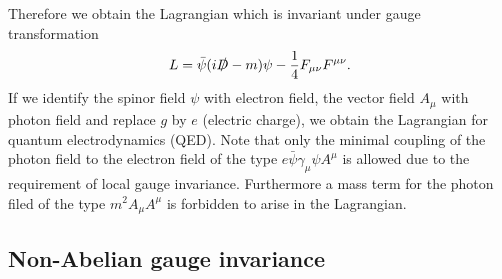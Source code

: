 Therefore we obtain the Lagrangian which is invariant under gauge transformation
\begin{equation}
L=\bar{\psi}(i\slashed{D}-m)\psi-\frac{1}{4}F_{\mu\nu}F^{\mu\nu}.
\end{equation}
If we identify the spinor field $\psi$ with electron field, the vector field $A_\mu$ with photon field and replace $g$ by $e$ (electric charge), we obtain the Lagrangian for quantum electrodynamics (QED). Note that only the minimal coupling of the photon field to the electron field of the type $e\bar{\psi}\gamma_\mu\psi A^\mu$ is allowed due to the requirement of local gauge invariance. Furthermore a mass term for the photon filed of the type $m^2A_\mu A^\mu$ is forbidden to arise in the Lagrangian. 

\subsection{Non-Abelian gauge invariance}

